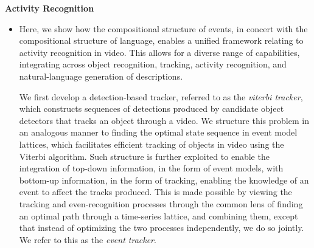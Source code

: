 \documentclass[10pt]{article}
\newenvironment{researchBlock}[1]{%
  \vspace*{0.5ex}
  {\noindent\large \textbf{#1}}
  \begin{itemize}\item}
  {\end{itemize}\vspace{3ex}}
\begin{document}
\begin{researchBlock} {Activity Recognition}

  Here, we show how the compositional structure of events, in concert with the
  compositional structure of language, enables a unified framework relating to
  activity recognition in video.
  This allows for a diverse range of capabilities, integrating across object
  recognition, tracking, activity recognition, and natural-language generation
  of descriptions.

  We first develop a detection-based tracker, referred to as the \emph{viterbi
    tracker}, which constructs sequences of detections produced by candidate
  object detectors that tracks an object through a video.
  We structure this problem in an analogous manner to finding the optimal state
  sequence in event model lattices, which facilitates efficient tracking of
  objects in video using the Viterbi algorithm.
  Such structure is further exploited to enable the integration of top-down
  information, in the form of event models, with bottom-up information, in the
  form of tracking, enabling the knowledge of an event to affect the tracks
  produced.
  This is made possible by viewing the tracking and even-recognition processes
  through the common lens of finding an optimal path through a time-series
  lattice, and combining them, except that instead of optimizing the two
  processes independently, we do so jointly.
  We refer to this as the \emph{event tracker}.


\end{researchBlock}
\end{document}
